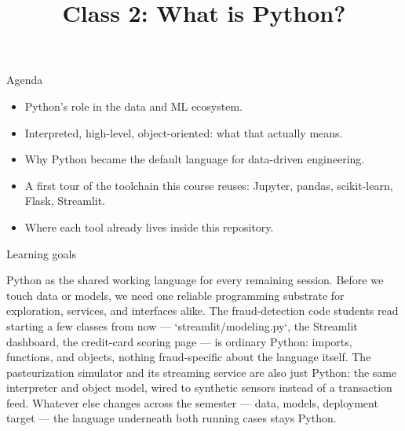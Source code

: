 

\title{Class 2: What is Python?}
\author{\coursename}
\date{}



\frame{\titlepage \coursefooter}

\begin{frame}{Agenda}
\begin{itemize}
\item Python's role in the data and ML ecosystem.
\item Interpreted, high-level, object-oriented: what that actually means.
\item Why Python became the default language for data-driven engineering.
\item A first tour of the toolchain this course reuses: Jupyter, pandas, scikit-learn, Flask, Streamlit.
\item Where each tool already lives inside this repository.
\end{itemize}
\coursefooter
\end{frame}

\begin{frame}{Learning goals}
\coursefooter
\end{frame}

\coursecontextframe
{Python as the shared working language for every remaining session.}
{Before we touch data or models, we need one reliable programming substrate for exploration, services, and interfaces alike.}
{The fraud-detection code students read starting a few classes from now --- `streamlit/modeling.py`, the Streamlit dashboard, the credit-card scoring page --- is ordinary Python: imports, functions, and objects, nothing fraud-specific about the language itself.}
{The pasteurization simulator and its streaming service are also just Python: the same interpreter and object model, wired to synthetic sensors instead of a transaction feed.}
{Whatever else changes across the semester --- data, models, deployment target --- the language underneath both running cases stays Python.}


